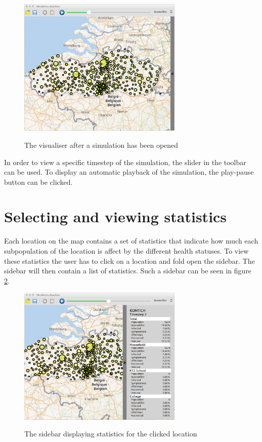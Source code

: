 \begin{figure}[H]
\centering
\includegraphics[width=0.7\textwidth,keepaspectratio]{images/view_simul.png}
\label{fig:screenshot_viewSimul}
\caption{The visualiser after a simulation has been opened}
\end{figure}

In order to view a specific timestep of the simulation, the slider in the toolbar can be used. To display an automatic playback of the simulation, the play-pause button can be clicked.

\section{Selecting and viewing statistics}
\label{section:stats_selection}

Each location on the map contains a set of statistics that indicate how much each subpopulation of the location is affect by the different health statuses. To view these statistics the user has to click on a location and fold open the sidebar. The sidebar will then contain a list of statistics. Such a sidebar can be seen in figure \ref{fig:sceenshot_statsLoc}.

\begin{figure}[H]
\centering
\includegraphics[width=0.7\textwidth,keepaspectratio]{images/stats_loc.png}
\label{fig:sceenshot_statsLoc}
\caption{The sidebar displaying statistics for the clicked location}
\end{figure}


